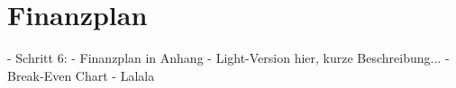 \section{Finanzplan}

	- Schritt 6: 
		- Finanzplan in Anhang
		- Light-Version hier, kurze Beschreibung...
		- Break-Even Chart 
		- Lalala
